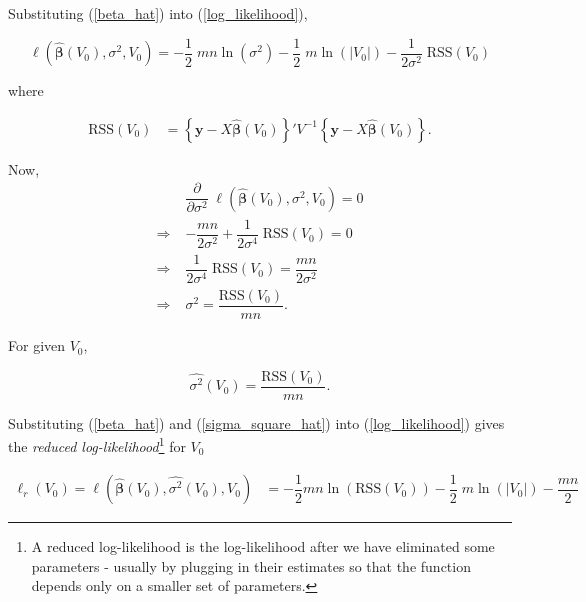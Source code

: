 \documentclass[11pt, a4paper]{article}
\begin{document}
Substituting (\ref{beta_hat}) into (\ref{log_likelihood}),

\begin{equation}\label{log_likelihood_with_beta_hat}
\ell(\widehat{\boldsymbol{\beta}}(V_0), \sigma^2, V_0) = -\dfrac{1}{2} \; mn \ln(\sigma^2) - \dfrac{1}{2} \; m \ln(\left| V_0 \right|) - \dfrac{1}{2\sigma^2} \; \text{RSS}(V_0)
\end{equation}

where

\begin{align*}
\text{RSS}(V_0) &= \left\{\boldsymbol{y} - X\widehat{\boldsymbol{\beta}}(V_0)\right\}' V^{-1} \left\{\boldsymbol{y} - X\widehat{\boldsymbol{\beta}}(V_0)\right\}.
\end{align*}

Now,
\begin{align}\label{derivate_wrt_sigma_square}
&\dfrac{\partial}{\partial {\sigma^2}} \; \ell(\widehat{\boldsymbol{\beta}}(V_0), \sigma^2, V_0) = 0 \nonumber \\[0.5em]
\Rightarrow \; &- \dfrac{mn}{2 \sigma^2} + \dfrac{1}{2\sigma^4} \; \text{RSS}(V_0) = 0 \nonumber \\[0.5em]
\Rightarrow \; &\dfrac{1}{2\sigma^4} \; \text{RSS}(V_0) = \dfrac{mn}{2 \sigma^2} \nonumber \\[0.5em]
\Rightarrow \; & \sigma^2 = \dfrac{\text{RSS}(V_0)}{mn}.
\end{align}

For given $V_0$,

\begin{equation}\label{sigma_square_hat}
\widehat{\sigma^2}(V_0) = \dfrac{\text{RSS}(V_0)}{mn}.
\end{equation}

\vspace{0.5cm}

Substituting (\ref{beta_hat}) and (\ref{sigma_square_hat}) into (\ref{log_likelihood}) gives the \textit{reduced log-likelihood}\footnote{A reduced log-likelihood is the log-likelihood after we have eliminated some parameters - usually by plugging in their estimates so that the function depends only on a smaller set of parameters.} for $V_0$

\begin{align*}
\ell_r(V_0) = \ell(\widehat{\boldsymbol{\beta}}(V_0), \widehat{\sigma^2}(V_0), V_0) &= -\dfrac{1}{2} mn \ln \left( \text{RSS}(V_0) \right) - \dfrac{1}{2} \; m \ln(\left| V_0 \right|) - \dfrac{mn}{2}
\end{align*}
\end{document}
